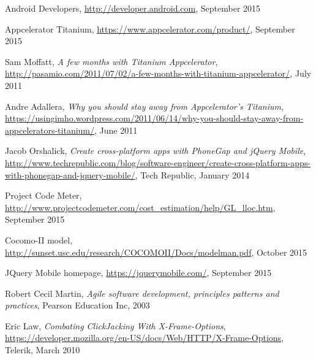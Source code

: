 \begin{thebibliography}{9}
	Android Developers,
	\url{http://developer.android.com},
	September 2015

	Appcelerator Titanium,
	\url{https://www.appcelerator.com/product/},
	September 2015

	Sam Moffatt,
	\emph{A few months with Titanium Appcelerator},
	\url{http://pasamio.com/2011/07/02/a-few-months-with-titanium-appcelerator/},
	July 2011

	Andre Adallera,
\emph{Why you should stay away from Appcelerator’s Titanium},
\url{https://usingimho.wordpress.com/2011/06/14/why-you-should-stay-away-from-appcelerators-titanium/},
	June 2011

Jacob Orshalick,
\emph{Create cross-platform apps with PhoneGap and jQuery Mobile},
\url{http://www.techrepublic.com/blog/software-engineer/create-cross-platform-apps-with-phonegap-and-jquery-mobile/},
	Tech Republic,
	January 2014
	
	Project Code Meter, 
	\url{http://www.projectcodemeter.com/cost_estimation/help/GL_lloc.htm},
	September 2015

	Cocomo-II model,
	\url{http://sunset.usc.edu/research/COCOMOII/Docs/modelman.pdf},
	October 2015

	JQuery Mobile homepage,
	\url{https://jquerymobile.com/},
	September 2015

	Robert Cecil Martin,
	\emph{Agile software development, principles patterns and practices},
	Pearson Education Inc,
	2003	

	Eric Law,
	\emph{Combating ClickJacking With X-Frame-Options},
	\url{https://developer.mozilla.org/en-US/docs/Web/HTTP/X-Frame-Options},
	Telerik,
	March 2010
\end{thebibliography}